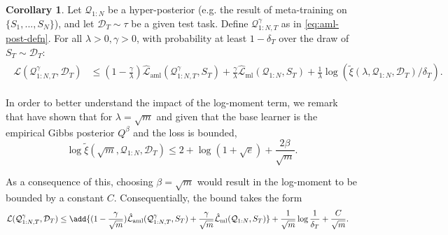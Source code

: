\documentclass{article} %
\theoremstyle{definition}
\newtheorem{corollary}[theorem]{Corollary}
\begin{document}
\begin{corollary} \label{thm:main-result-gibbs}
	Let $\mathcal{Q}_{1:N}$ be a hyper-posterior (e.g. the result of meta-training on $\{S_1,...,S_N\}$), and let $\mathcal{D}_T\sim \tau$ be a given test task. Define  $\mathcal{Q}^\gamma_{1:N,T}$ as in \eqref{eq:aml-post-defn}. 
	For all $\lambda>0, \gamma>0$, 
	with probability at least $1-\delta_T$ over the draw of $S_T\sim \mathcal{D}_T$:
	\begin{align} \label{eq:pb-adapt-multi}
	\begin{split}
	\mathcal{L}(\mathcal{Q}_{1:N,T}^{\gamma}, \mathcal{D}_T) &\leq 
	(1-\frac{\gamma}{\lambda})\hat{\mathcal{L}}_{\mathrm{aml}} (\mathcal{Q}^{\gamma}_{1:N,T}, S_T) + \frac{\gamma}{\lambda}\hat{\mathcal{L}}_{\mathrm{ml}}(\mathcal{Q}_{1:N}, S_T) 
	+\frac{1}{\lambda}\log\left (\tilde{\xi}(\lambda,\mathcal{Q}_{1:N},\mathcal{D}_T)/\delta_T\right ) .
	\end{split}
	\end{align}
\end{corollary}

In order to better understand the impact of the log-moment term, we remark that \citet{Rivasplata2020} have shown that for $\lambda=\sqrt{m}$ and given that the base learner is the empirical Gibbs posterior $Q^\beta$ and the loss is bounded,
$$\log\tilde{\xi}(\sqrt{m},\mathcal{Q}_{1:N},\mathcal{D}_T) \leq 2+\log(1+\sqrt{e})+\frac{2\beta}{\sqrt{m}} .$$

As a consequence of this, choosing $\beta=\sqrt{m}$ would result 
in the log-moment to be bounded by a constant $C$. Consequentially, the bound takes the form
    \begin{align*}
    \begin{split}
    \mathcal{L}(\mathcal{Q}_{1:N,T}^{\gamma}, \mathcal{D}_T) &\leq \add{(1-\frac{\gamma}{\sqrt{m}})\hat{\mathcal{L}}_{\mathrm{aml}} (\mathcal{Q}^{\gamma}_{1:N,T}, S_T) +
    \frac{\gamma}{\sqrt{m}}\hat{\mathcal{L}}_{\mathrm{ml}}(\mathcal{Q}_{1:N}, S_T) }
+\frac{1}{\sqrt{m}}\log\frac{1}{\delta_T}+\frac{C}{\sqrt{m}} .
    \end{split}
    \end{align*}

\end{document}
